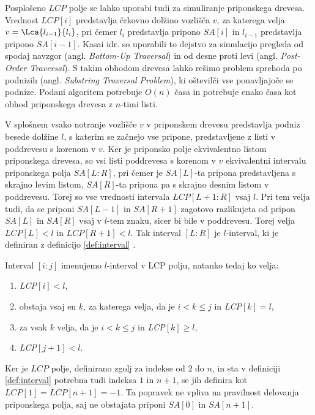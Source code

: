 Posplošeno $LCP$ polje se lahko uporabi tudi za simuliranje priponskega drevesa. Vrednost $LCP[i]$ predstavlja črkovno dolžino vozlišča $v$, za katerega velja $v=\Lca{l_{i-1}}{l_i}$, pri čemer $l_i$ predstavlja pripono $SA[i]$ in $l_{i-1}$ predstavlja pripono $SA[i-1]$. Kasai idr. \cite{Kasai2001} so uporabili to dejstvo za simulacijo pregleda od spodaj navzgor (angl. \textit{Bottom-Up Traversal}) in od desne proti levi (angl. \textit{Post-Order Traversal}). S takim obhodom drevesa lahko rešimo problem sprehoda po podnizih (angl. \textit{Substring Traversal Problem}), ki oštevilči vse ponavljajoče se podnize. Podani algoritem potrebuje $O(n)$ časa in potrebuje enako časa kot obhod priponskega drevesa z $n$-timi listi.

V splošnem vsako notranje vozlišče $v$ v priponskem drevesu predstavlja podniz besede dolžine $l$, s katerim se začnejo vse pripone, predstavljene z listi v poddrevesu s korenom v $v$. Ker je priponsko polje ekvivalentno listom priponskega drevesa, so vsi listi poddrevesa s korenom v $v$ ekvivalentni intervalu priponskega polja $SA[L:R]$, pri čemer je $SA[L]$-ta pripona predstavljena s skrajno levim listom, $SA[R]$-ta pripona pa s skrajno desnim listom v poddrevesu. Torej so vse vrednosti intervala $LCP[L+1:R]$ vsaj $l$. Pri tem velja tudi, da se priponi $SA[L-1]$ in $SA[R+1]$ zagotovo razlikujeta od pripon $SA[L]$ in $SA[R]$ vsaj v $l$-tem znaku, sicer bi bile v poddrevesu. Torej velja $LCP[L]< l$ in $LCP[R+1]< l$. Tak interval $[L:R]$ je $l$-interval, ki je definiran z definicijo \ref{def:interval} \cite{Abouelhoda2004}.

\begin{defi}\label{def:interval}
    Interval $[i:j]$ imenujemo $l$-interval v LCP polju, natanko tedaj ko velja:
    \begin{enumerate}
        \item \textit{LCP}$[i]<l$,
        \item obstaja vsaj en $k$, za katerega velja, da je $i< k\le j$ in \textit{LCP}$[k]=l$,
        \item za vsak $k$ velja, da je $i< k\le j$ in \textit{LCP}$[k]\ge l$,
        \item \textit{LCP}$[j+1]<l$.      
    \end{enumerate}
\end{defi}

Ker je $LCP$ polje, definirano zgolj za indekse od $2$ do $n$, in sta v definiciji \ref{def:interval} potrebna tudi indeksa $1$ in $n+1$, se jih definira kot $LCP[1]=LCP[n+1]=-1$. Ta popravek ne vpliva na pravilnost delovanja priponskega polja, saj ne obstajata priponi $SA[0]$ in $SA[n+1]$. 


